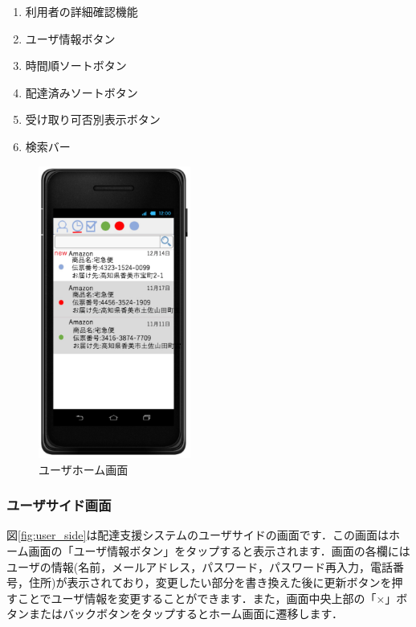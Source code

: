 \documentclass[a4j,titlepage]{jarticle}
\begin{document}
\begin{enumerate}
	\item 利用者の詳細確認機能\\

	\item ユーザ情報ボタン\\

	\item 時間順ソートボタン\\

	\item 配達済みソートボタン\\

	\item 受け取り可否別表示ボタン\\

	\item 検索バー\\

\end{enumerate}

\begin{figure}[htbp]
 \begin{center}
  \includegraphics[width=50mm]{user_home}
	\caption{ユーザホーム画面}
	\label{fig:user_home}
 \end{center}

\end{figure}

\subsubsection{ユーザサイド画面}
図\ref{fig:user_side}は配達支援システムのユーザサイドの画面です．この画面はホーム画面の「ユーザ情報ボタン」をタップすると表示されます．画面の各欄にはユーザの情報(名前，メールアドレス，パスワード，パスワード再入力，電話番号，住所)が表示されており，変更したい部分を書き換えた後に更新ボタンを押すことでユーザ情報を変更することができます．また，画面中央上部の「×」ボタンまたはバックボタンをタップするとホーム画面に遷移します．
\end{document}
